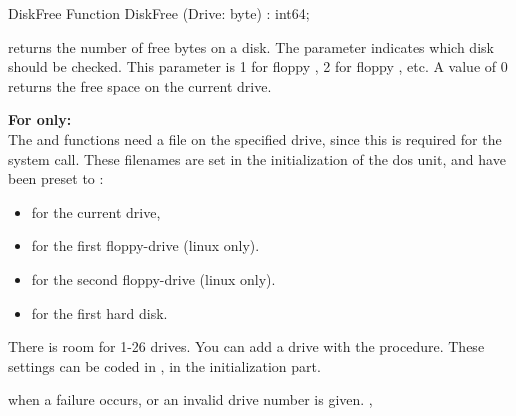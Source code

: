 \begin{function}{DiskFree}
\Declaration
Function DiskFree (Drive: byte) : int64;
\Description

 returns the number of free bytes on a disk. The parameter
 indicates which disk should be checked. This parameter is 1 for
floppy , 2 for floppy , etc. A value of 0 returns the free
space on the current drive. 

\textbf{For \unix only:}\\
The  and  functions need a file on the 
specified drive, since this is required for the  system call.
These filenames are set in the initialization of the dos unit, and have 
been preset to :
\begin{itemize}
\item {} for the current drive, 
\item {} for the first floppy-drive (linux only).
\item {} for the second floppy-drive (linux only).
\item {} for the first hard disk.
\end{itemize}
There is room for 1-26 drives. You can add a drive with the
 procedure.
These settings can be coded in , in the initialization part.

 when a failure occurs, or an invalid drive number is given.
\SeeAlso
{}, 
\end{function}


